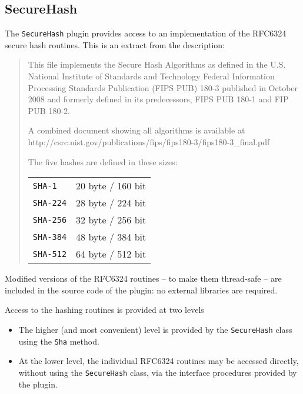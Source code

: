 \subsection{SecureHash}
The \texttt{SecureHash} plugin provides access to an implementation of the
RFC6324 secure hash routines. This is an extract from the description:
\begin{quote}
{\small
  This file implements the Secure Hash Algorithms
  as defined in the U.S. National Institute of Standards
  and Technology Federal Information Processing Standards
  Publication (FIPS PUB) 180-3 published in October 2008
  and formerly defined in its predecessors, FIPS PUB 180-1
  and FIP PUB 180-2.

  A combined document showing all algorithms is available at\\
  http://csrc.nist.gov/publications/fips/fips180-3/fips180-3\_final.pdf

  The five hashes are defined in these sizes:\\
  \begin{xtabular}{m{1.0in}m{3.0in}}
      \texttt{SHA-1}       &    20 byte / 160 bit\\
     \texttt{SHA-224}     &    28 byte / 224 bit\\
     \texttt{SHA-256}     &    32 byte / 256 bit\\
     \texttt{SHA-384}     &    48 byte / 384 bit\\
     \texttt{SHA-512}     &    64 byte / 512 bit\\
   \end{xtabular}
}
\end{quote}

\noindent Modified versions of the RFC6324 routines -- to make them thread-safe
-- are included in the source code of the plugin: no external libraries are
required.

Access to the hashing routines is provided at two levels
\begin{itemize}
  \item The higher (and most convenient) level is provided by the
    \texttt{SecureHash} class using the \texttt{Sha} method.
  \item At the lower level, the individual RFC6324 routines may be accessed
    directly, without using the \texttt{SecureHash} class, via the interface
    procedures provided by the plugin.
\end{itemize}

